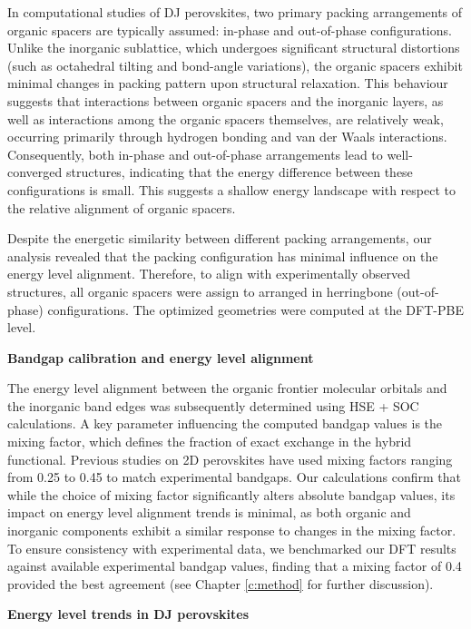 In computational studies of DJ perovskites, two primary packing arrangements of organic spacers are typically assumed: in-phase and out-of-phase configurations. Unlike the inorganic sublattice, which undergoes significant structural distortions (such as octahedral tilting and bond-angle variations), the organic spacers exhibit minimal changes in packing pattern upon structural relaxation. This behaviour suggests that interactions between organic spacers and the inorganic layers, as well as interactions among the organic spacers themselves, are relatively weak, occurring primarily through hydrogen bonding and van der Waals interactions. Consequently, both in-phase and out-of-phase arrangements lead to well-converged structures, indicating that the energy difference between these configurations is small. This suggests a shallow energy landscape with respect to the relative alignment of organic spacers.

Despite the energetic similarity between different packing arrangements, our analysis revealed that the packing configuration has minimal influence on the energy level alignment. Therefore, to align with experimentally observed structures, all organic spacers were assign to arranged in herringbone (out-of-phase) configurations\cite{RN41}. The optimized geometries were computed at the DFT-PBE level. 

\textbf{Bandgap calibration and energy level alignment}

The energy level alignment between the organic frontier molecular orbitals and the inorganic band edges was subsequently determined using HSE + SOC calculations. A key parameter influencing the computed bandgap values is the mixing factor, which defines the fraction of exact exchange in the hybrid functional. Previous studies on 2D perovskites have used mixing factors ranging from 0.25 to 0.45 to match experimental bandgaps. Our calculations confirm that while the choice of mixing factor significantly alters absolute bandgap values, its impact on energy level alignment trends is minimal, as both organic and inorganic components exhibit a similar response to changes in the mixing factor.
To ensure consistency with experimental data, we benchmarked our DFT results against available experimental bandgap values, finding that a mixing factor of 0.4 provided the best agreement (see Chapter \ref{c:method} for further discussion).

\textbf{Energy level trends in DJ perovskites}

